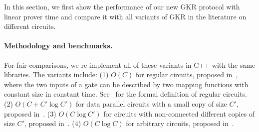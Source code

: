 In this section, we first show the performance of our new GKR protocol with linear prover time and compare it with all variants of GKR in the literature on different circuits.

\paragraph{Methodology and benchmarks.} For fair comparisons, we re-implement all of these variants in C++ with the same libraries. The variants include: (1) $O(C)$ for regular circuits, proposed in~\cite{t13}, where the two inputs of a gate can be described by two mapping functions with constant size in constant time. See~\cite{t13} for the formal definition of regular circuits. (2) $O(C+C'\log C')$ for data parallel circuits with a small copy of size $C'$, proposed in~\cite{wahby2017full}. (3) $O(C\log C')$ for circuits with non-connected different copies of size $C'$, proposed in~\cite{vram}. (4) $O(C\log C)$ for arbitrary circuits, proposed in~\cite{CMT}.


